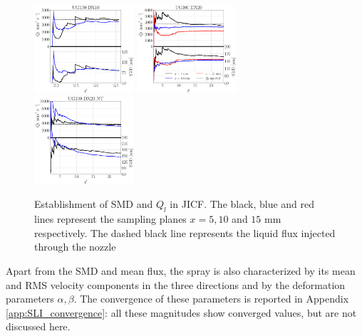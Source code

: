 \begin{figure}[ht]
   \includegraphics[width=0.33\textwidth]{./part2_developments/figures_ch5_resolved_JICF/SPRAY_characterization/establishment_and_fluxes/establishment_UG100_DX10}
   \hspace*{-0.1in}
   \includegraphics[width=0.33\textwidth]{./part2_developments/figures_ch5_resolved_JICF/SPRAY_characterization/establishment_and_fluxes/establishment_UG100_DX20}
   \hspace*{-0.1in}
   \includegraphics[width=0.33\textwidth]{./part2_developments/figures_ch5_resolved_JICF/SPRAY_characterization/establishment_and_fluxes/establishment_UG100_DX20_NT}
   \vspace*{-0.05in}
   \caption[Establishment of SMD and $Q_l$ in JICF sampling planes]{Establishment of SMD and $Q_l$ in JICF. The black, blue and red lines represent the sampling planes $x = 5, 10$ and $15$ mm respectively. The dashed black line represents the liquid flux injected through the nozzle}
\label{fig:ch5_spray_char_establishment}
\end{figure}


Apart from the SMD and mean flux, the spray is also characterized by its mean and RMS velocity components in the three directions and by the deformation parameters $\alpha, \beta$. The convergence of these parameters is reported in Appendix \ref{app:SLI_convergence}: all these magnitudes show converged values, but are not discussed here. \\



